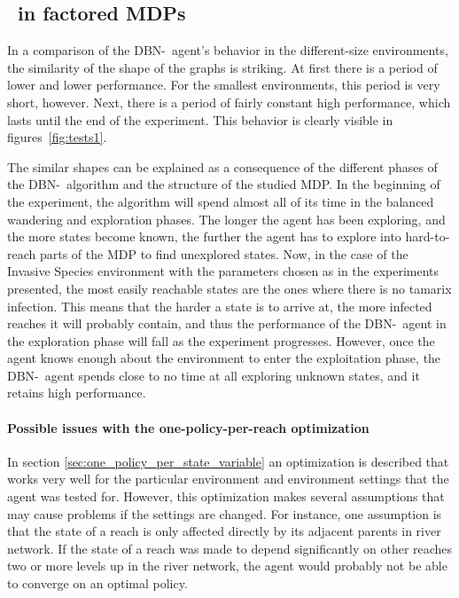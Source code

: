 \subsection{\etre\ in factored MDPs}
\label{sec:e3_factored_discussion}

In a comparison of the DBN-\etre\ agent's behavior in the different-size environments, the similarity of the shape of the graphs is striking. At first there is a period of lower and lower performance. For the smallest environments, this period is very short, however. Next, there is a period of fairly constant high performance, which lasts until the end of the experiment. This behavior is clearly visible in figures~\ref{fig:tests1}.   

The similar shapes can be explained as a consequence of the different phases  of the DBN-\etre\ algorithm and the structure of the studied MDP. In the beginning of the experiment, the algorithm will spend almost all of its time in the balanced wandering and exploration phases. The longer the agent has been exploring, and the more states become known, the further the agent has to explore into hard-to-reach parts of the MDP to find unexplored states. Now, in the case of the Invasive Species environment with the parameters chosen as in the experiments presented, the most easily reachable states are the ones where there is no tamarix infection. This means that the harder a state is to arrive at, the more infected reaches it will probably contain, and thus the performance of the DBN-\etre\ agent in the exploration phase will fall as the experiment progresses. However, once the agent knows enough about the environment to enter the exploitation phase, the DBN-\etre\ agent spends close to no time at all exploring unknown states, and it retains high performance. 


\paragraph{Possible issues with the one-policy-per-reach optimization} In section \ref{sec:one_policy_per_state_variable} an optimization is described that works very well for the particular environment and environment settings that the agent was tested for. However, this optimization makes several assumptions that may cause problems if the settings are changed. For instance, one assumption is that the state of a reach is only affected directly by its adjacent parents in river network. If the state of a reach was made to depend significantly on other reaches two or more levels up in the river network, the agent would probably not be able to converge on an optimal policy. 

